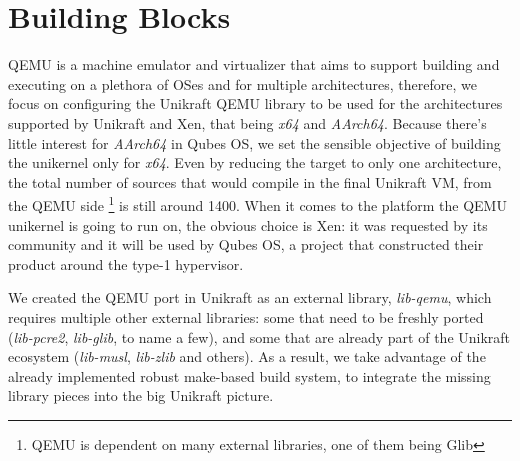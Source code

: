 \chapter{Building Blocks}
\label{chapter:building-blocks}

QEMU \cite{qemu} is a machine emulator and virtualizer that aims to support building and executing on a plethora of OSes and for multiple architectures, therefore, we focus on configuring the Unikraft QEMU library to be used for the architectures supported by Unikraft and Xen, that being \textit{x64} and \textit{AArch64}.
Because there's little interest for \textit{AArch64} in Qubes OS, we set the sensible objective of building the unikernel only for \textit{x64}.
Even by reducing the target to only one architecture, the total number of sources that would compile in the final Unikraft VM, from the QEMU side \footnote{QEMU is dependent on many external libraries, one of them being Glib} is still around 1400.
When it comes to the platform the QEMU unikernel is going to run on, the obvious choice is Xen: it was requested by its community and it will be used by Qubes OS, a project that constructed their product around the type-1 hypervisor.

We created the QEMU port in Unikraft as an external library, \textit{lib-qemu}, which requires multiple other external libraries: some that need to be freshly ported (\textit{lib-pcre2}, \textit{lib-glib}, to name a few), and some that are already part of the Unikraft ecosystem (\textit{lib-musl}, \textit{lib-zlib} and others).
As a result, we take advantage of the already implemented robust make-based build system, to integrate the missing library pieces into the big Unikraft picture.
